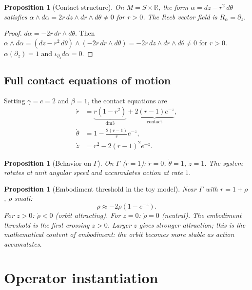\documentclass[12pt, oneside]{book}
\theoremstyle{plain}
\newtheorem{proposition}[theorem]{Proposition}
\theoremstyle{definition}
\theoremstyle{remark}
\newcommand{\R}{\mathbb{R}}
\newcommand{\Orb}{\Gamma}
\begin{document}
\begin{proposition}[Contact structure]\label{prop:contactstruct}
On $M=S\times\R$, the form $\alpha=dz-r^2\,d\theta$ satisfies
$\alpha\wedge d\alpha=2r\,dz\wedge dr\wedge d\theta\ne 0$
for $r>0$. The Reeb vector field is $R_\alpha=\partial_z$.
\end{proposition}
\begin{proof}
$d\alpha=-2r\,dr\wedge d\theta$. Then
$\alpha\wedge d\alpha=(dz-r^2\,d\theta)\wedge(-2r\,dr\wedge d\theta)
=-2r\,dz\wedge dr\wedge d\theta\ne 0$ for $r>0$.
$\alpha(\partial_z)=1$ and $\iota_{\partial_z}d\alpha=0$.
\end{proof}

\subsection{Full contact equations of motion}

Setting $\gamma=c=2$ and $\beta=1$, the contact equations are
\begin{align}
  \dot r &= \underbrace{r(1-r^2)}_{\text{dm3}}
           + \underbrace{2(r-1)e^{-z}}_{\text{contact}},
           \label{eq:r-full}\\
  \dot\theta &= 1 - \frac{2(r-1)}{r}e^{-z},\label{eq:theta-full}\\
  \dot z &= r^2 - 2(r-1)^2 e^{-z}.\label{eq:z-full}
\end{align}

\begin{proposition}[Behavior on $\Orb$]\label{prop:onorbit}
On $\Orb$ ($r=1$): $\dot r=0$, $\dot\theta=1$, $\dot z=1$.
The system rotates at unit angular speed and accumulates action
at rate $1$.
\end{proposition}

\begin{proposition}[Embodiment threshold in the toy model]\label{prop:threshold}
Near $\Orb$ with $r=1+\rho$, $\rho$ small:
\[
  \dot\rho \approx -2\rho(1-e^{-z}).
\]
For $z>0$: $\dot\rho<0$ (orbit attracting). For $z=0$: $\dot\rho=0$
(neutral). The embodiment threshold is the first crossing $z>0$.
Larger $z$ gives stronger attraction; this is the mathematical
content of embodiment: the orbit becomes more stable as action
accumulates.
\end{proposition}

\section{Operator instantiation}\label{sec:operators}
\end{document}
